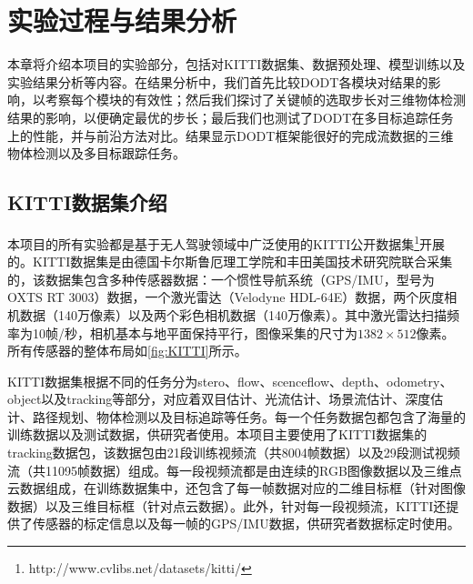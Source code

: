 
\chapter{实验过程与结果分析}
\label{experiment}
本章将介绍本项目的实验部分，包括对KITTI数据集、数据预处理、模型训练以及实验结果分析等内容。在结果分析中，我们首先比较DODT各模块对结果的影响，以考察每个模块的有效性；然后我们探讨了关键帧的选取步长对三维物体检测结果的影响，以便确定最优的步长；最后我们也测试了DODT在多目标追踪任务上的性能，并与前沿方法对比。结果显示DODT框架能很好的完成流数据的三维物体检测以及多目标跟踪任务。

\section{KITTI数据集介绍}
\label{kitti}
本项目的所有实验都是基于无人驾驶领域中广泛使用的KITTI公开数据集\footnote[7]{http://www.cvlibs.net/datasets/kitti/}开展的。KITTI数据集是由德国卡尔斯鲁厄理工学院和丰田美国技术研究院联合采集的，该数据集包含多种传感器数据：一个惯性导航系统（GPS/IMU，型号为OXTS RT 3003）数据，一个激光雷达（Velodyne HDL-64E）数据，两个灰度相机数据（140万像素）以及两个彩色相机数据（140万像素）。其中激光雷达扫描频率为10帧/秒，相机基本与地平面保持平行，图像采集的尺寸为$1382 \times 512$像素。所有传感器的整体布局如\figurename \ref{fig:KITTI}所示。



KITTI数据集根据不同的任务分为stero、flow、scenceflow、depth、odometry、object以及tracking等部分，对应着双目估计、光流估计、场景流估计、深度估计、路径规划、物体检测以及目标追踪等任务。每一个任务数据包都包含了海量的训练数据以及测试数据，供研究者使用。本项目主要使用了KITTI数据集的tracking数据包，该数据包由21段训练视频流（共8004帧数据）以及29段测试视频流（共11095帧数据）组成。每一段视频流都是由连续的RGB图像数据以及三维点云数据组成，在训练数据集中，还包含了每一帧数据对应的二维目标框（针对图像数据）以及三维目标框（针对点云数据）。此外，针对每一段视频流，KITTI还提供了传感器的标定信息以及每一帧的GPS/IMU数据，供研究者数据标定时使用。

